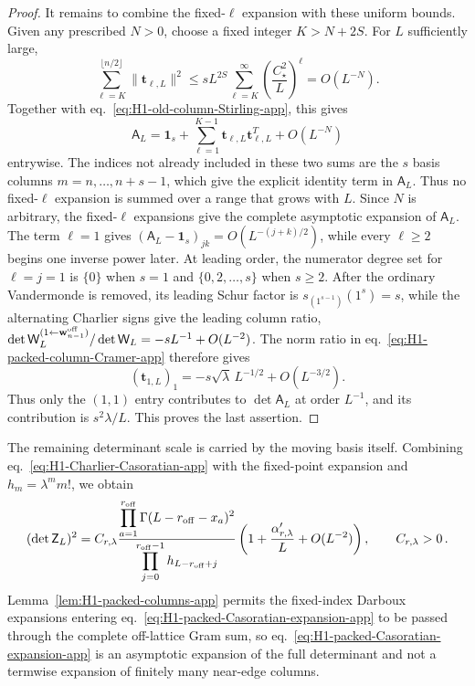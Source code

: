 \documentclass[a4paper,11pt]{article}
\theoremstyle{definition}
\theoremstyle{remark}
\newcommand{\Id}{\mathbf 1}
\begin{document}
\begin{proof}
It remains to combine the fixed-\(\ell\) expansion with these uniform
bounds. Given any prescribed \(N>0\), choose a fixed integer
\(K>N+2S\). For \(L\) sufficiently large,
\begin{equation}
   \sum_{\ell=K}^{\lfloor n/2\rfloor}
   \|\mathbf t_{\ell,L}\|^2
   \le
   sL^{2S}\sum_{\ell=K}^{\infty}
   \left(\frac{C_\star^2}{L}\right)^\ell
   =O(L^{-N}).
   \label{eq:H1-packed-tail-split-app}
\end{equation}
Together with eq.~\eqref{eq:H1-old-column-Stirling-app}, this gives
\begin{equation}
   \mathsf A_L
   =
   \Id_s+\sum_{\ell=1}^{K-1}
   \mathbf t_{\ell,L}\mathbf t_{\ell,L}^T+O(L^{-N})
   \label{eq:H1-packed-fixed-K-reduction-app}
\end{equation}
entrywise. The indices not already included in these two sums are the
\(s\) basis columns \(m=n,\ldots,n+s-1\), which give the explicit
identity term in \(\mathsf A_L\). Thus no fixed-\(\ell\) expansion is
summed over a range that
grows with \(L\). Since \(N\) is arbitrary, the fixed-\(\ell\)
expansions give the complete asymptotic expansion of \(\mathsf A_L\).
The term \(\ell=1\) gives
\((\mathsf A_L-\Id_s)_{jk}=O(L^{-(j+k)/2})\), while every
\(\ell\ge2\) begins one inverse power later. At leading order,
the numerator degree set for \(\ell=j=1\) is \(\{0\}\) when \(s=1\)
and \(\{0,2,\ldots,s\}\) when \(s\ge2\). After the ordinary
Vandermonde is removed, its
leading Schur factor is \(s_{(1^{s-1})}(1^s)=s\), while the alternating
Charlier signs give the leading column ratio, 
\(\det\mathsf W_L^{(1\leftarrow\mathbf w_{n-1}^{\rm off})}/
\det\mathsf W_L=-sL^{-1}+O(L^{-2})\). The norm ratio in
eq.~\eqref{eq:H1-packed-column-Cramer-app} therefore gives
\begin{equation}
   (\mathbf t_{1,L})_1
   =-s\sqrt{\lambda}\,L^{-1/2}+O(L^{-3/2}).
   \label{eq:H1-packed-first-coordinate-app}
\end{equation}
Thus only the \((1,1)\) entry contributes to
\(\det\mathsf A_L\) at order \(L^{-1}\), and its contribution is
\(s^2\lambda/L\). This proves the last assertion.
\end{proof}
The remaining determinant scale is carried by the moving basis itself.
Combining eq.~\eqref{eq:H1-Charlier-Casoratian-app} with the fixed-point
expansion and \(h_m=\lambda^m m!\), we obtain
\begin{equation}
   (\det\mathsf Z_L)^2
   =C_{r,\lambda}
   \frac{\displaystyle
      \prod_{a=1}^{r_{\rm off}}
      \Gamma(L-r_{\rm off}-x_a)^2}
   {\displaystyle
      \prod_{j=0}^{r_{\rm off}-1}
      h_{L-r_{\rm off}+j}}
   \left(
      1+\frac{\alpha'_{r,\lambda}}{L}+O(L^{-2})
   \right),
   \qquad C_{r,\lambda}>0\,.
   \label{eq:H1-packed-Casoratian-expansion-app}
\end{equation}
Lemma~\ref{lem:H1-packed-columns-app} permits the fixed-index Darboux
expansions entering eq.~\eqref{eq:H1-packed-Casoratian-expansion-app}
to be passed through the complete off-lattice Gram sum, so
eq.~\eqref{eq:H1-packed-Casoratian-expansion-app} is an asymptotic expansion of the full
determinant and not a termwise expansion of finitely many near-edge columns.
\end{document}
